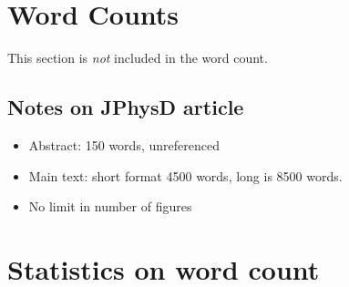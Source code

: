 \section*{Word Counts}
This section is \textit{not} included in the word count.
\subsection*{Notes on JPhysD article}
\begin{itemize}
    \item Abstract: 150 words, unreferenced
    \item Main text: short format 4500 words, long is 8500 words.
    \item No limit in number of figures
\end{itemize}

\section*{Statistics on word count}

\immediate{}

